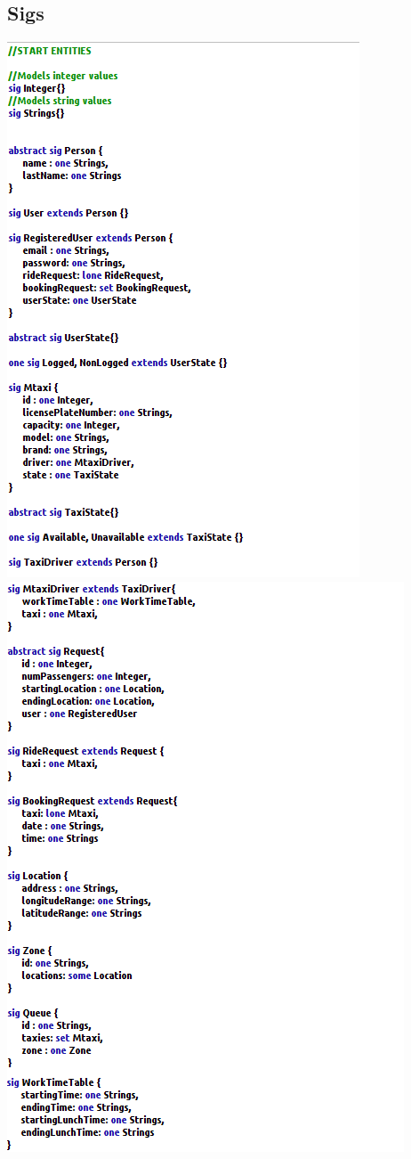 \documentclass[11pt,titlepage]{article} %
\begin{document}
	\subsection{Sigs}
		\includegraphics[scale=0.8]{sig1.png}
		\newpage
		\includegraphics[scale=0.8]{sig2.png}
		
\end{document}
